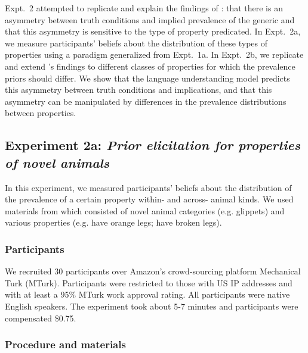 \documentclass[10pt,letterpaper]{article}
\begin{document}

Expt.~2 attempted to replicate and explain the findings of : that there is an asymmetry between truth conditions and implied prevalence of the generic and that this asymmetry is sensitive to the type of property predicated. 
In Expt.~2a, we measure participants' beliefs about the distribution of these types of properties using a paradigm generalized from Expt.~1a. 
In Expt.~2b, we replicate and extend \citeauthor{Cimpian2010}'s findings to different classes of properties for which the prevalence priors should differ. 
We show that the language understanding model predicts this asymmetry between truth conditions and implications, and that this asymmetry can be manipulated by differences in the prevalence distributions between properties.



\subsection{Experiment 2a: \emph{Prior elicitation for properties of novel animals}}

In this experiment, we measured participants' beliefs about the distribution of the prevalence of a certain property within- and across- animal kinds. 
We used materials from  which consisted of novel animal categories (e.g. glippets) and various properties (e.g. have orange legs; have broken legs).


\subsubsection{Participants}

We recruited 30 participants over Amazon's crowd-sourcing platform Mechanical Turk (MTurk).  Participants were restricted to those with US IP addresses and with at least a 95\% MTurk work approval rating. All participants were native English speakers. The experiment took about 5-7 minutes and participants were compensated \$0.75.

\subsubsection{Procedure and materials}
\end{document}
